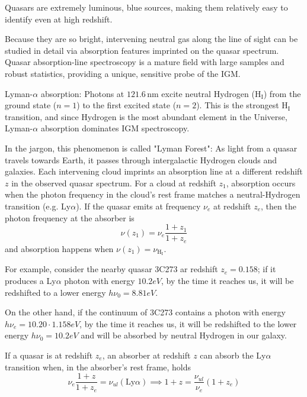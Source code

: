 Quasars are extremely luminous, blue sources, making them relatively easy to identify even at high redshift.
\par Because they are so bright, intervening neutral gas along the line of sight can be studied in detail via absorption features imprinted on the quasar spectrum. Quasar absorption-line spectroscopy is a mature field with large samples and robust statistics, providing a unique, sensitive probe of the IGM.
\par Lyman-$\alpha$ absorption: Photons at $121.6\,\text{nm}$ excite neutral Hydrogen ($\text{H}_{\text{I}}$) from the ground state ($n=1$) to the first excited state ($n=2$). This is the strongest $\text{H}_{\text{I}}$ transition, and since Hydrogen is the most abundant element in the Universe, Lyman-$\alpha$ absorption dominates IGM spectroscopy.
\par In the jargon, this phenomenon is called "Lyman Forest": As light from a quasar travels towards Earth, it passes through intergalactic Hydrogen clouds and galaxies. Each intervening cloud imprints an absorption line at a different redshift $z$ in the observed quasar spectrum. For a cloud at redshift $z_{1}$, absorption occurs when the photon frequency in the cloud’s rest frame matches a neutral-Hydrogen transition (e.g. Ly$\alpha$). If the quasar emits at frequency $\nu_{e}$ at redshift $z_{e}$, then the photon frequency at the absorber is
\begin{equation*}
    \nu(z_{1}) = \nu_{e}\frac{1+z_{1}}{1+z_{e}}
\end{equation*}
and absorption happens when $\nu(z_{1}) = \nu_{\text{H}_{\text{I}}}$.
\par For example, consider the nearby quasar 3C273 ar redshift $z_{e}=0.158$; if it produces a Ly$\alpha$ photon with energy $10.2\unit{eV}$, by the time it reaches us, it will be redshifted to a lower energy $h\nu_{0} = 8.81\unit{eV}$.
\par On the other hand, if the continuum of 3C273 contains a photon with energy $h\nu_{e} = 10.20\cdot1.158\unit{eV}$, by the time it reaches us, it will be redshifted to the lower energy $h\nu_{0}=10.2\unit{eV}$ and will be absorbed by neutral Hydrogen in our galaxy.
\par If a quasar is at redshift $z_{e}$, an absorber at redshift $z$ can absorb the Ly$\alpha$ transition when, in the absorber's rest frame, holds
\begin{equation*}
    \nu_{e} \frac{1+z}{1+z_{e}} = \nu_{ul}(\text{Ly}\alpha) \implies 1+z = \frac{\nu_{ul}}{\nu_{e}}(1+z_{e})
\end{equation*}
